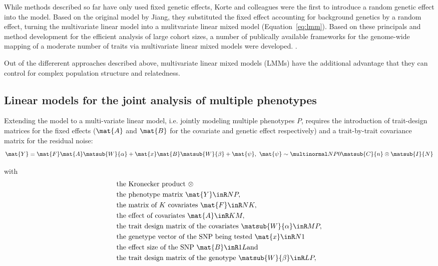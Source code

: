 While methods described so far have only used fixed genetic effects, Korte and colleagues \citeyear{Korte2012} were the first to introduce a random genetic effect into the model. Based on the original model by Jiang, they substituted the fixed effect accounting for background genetics by a random effect, turning the multivariate linear model into a mulitvariate linear mixed model (Equation~\ref{eq:lmm}). Based on these principals and method development for the efficient analysis of large cohort sizes, a number of publically available frameworks for the genome-wide mapping of a moderate number of traits via multivariate linear mixed models were developed. \citep{Korte2012,Yang2011,Lippert2014,Zhou2014,Casale2015}. 

Out of the differerent approaches described above, multivariate linear mixed models (LMMs) have the additional advantage that they can control for complex population structure and relatedness. 

\subsection{Linear models for the joint analysis of multiple phenotypes}
Extending the model to a multi-variate linear model, i.e. jointly modeling multiple phenotypes \(P\), requires the introduction of trait-design matrices for the fixed effects (\(\mat{A}\) and \(\mat{B}\) for the covariate and genetic effect respectively) and a trait-by-trait covariance matrix  for the residual noise:
\begin{equation}
\mat{Y} =\mat{F}\mat{A}\matsub{W}{\alpha} +\mat{x}\mat{B}\matsub{W}{\beta} + \mat{\psi},\text{ }
\mat{\psi}\sim \multinormal N P 0 {\matsub{C}{n} \otimes\matsub{I}{N}}
\label{eq:lm-mv}
\end{equation}

with
\begin{align*} 
& \text{the Kronecker product } \otimes \\
& \text{the phenotype matrix }\mat{Y} \inR N P,\\
& \text{the matrix of $K$ covariates }\mat{F} \inR N K,\\
& \text{the effect of covariates } \mat{A} \inR K M,\\
& \text{the trait design matrix of the covariates }\matsub{W}{\alpha} \inR M P,\\
& \text{the genetype vector of the SNP being tested }\mat{x} \inR N 1\\
& \text{the effect size of the SNP } \mat{B} \inR 1 L \text{and}\\
& \text{the trait design matrix of the genotype }\matsub{W}{\beta} \inR L P,\\
\end{align*} 

